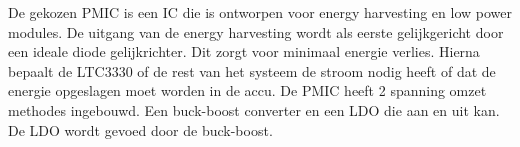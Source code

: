 De gekozen PMIC is een IC die is ontworpen voor energy harvesting en low power modules. De uitgang van de energy harvesting wordt als eerste gelijkgericht door een ideale diode gelijkrichter. Dit zorgt voor minimaal energie verlies. Hierna bepaalt de LTC3330 of de rest van het systeem de stroom nodig heeft of dat de energie opgeslagen moet worden in de accu. De PMIC heeft 2 spanning omzet methodes ingebouwd. Een buck-boost converter en een LDO die aan en uit kan. De LDO wordt gevoed door de buck-boost.